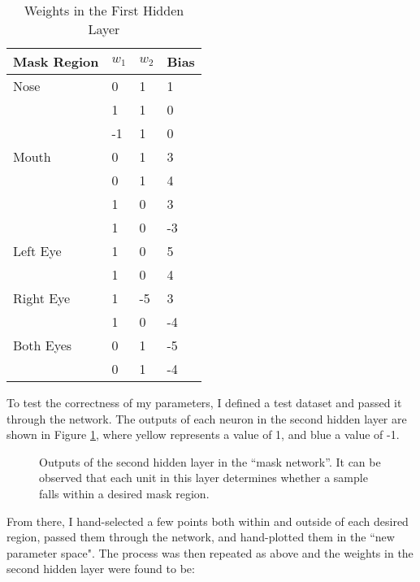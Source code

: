 \documentclass{article}[12 pt]
\begin{document}
\begin{table}[H]
	\caption{Weights in the First Hidden Layer}
	\label{tab:WeightsFirstHiddenLayer}
	\begin{center}
		\begin{tabularx}{\textwidth}{ |X|X|X|X| } 
			\hline
			\textbf{Mask Region} & \textbf{$w_1$} & \textbf{$w_2$} & \textbf{Bias}\\
			\hline
			Nose & 0 &  1& 1\\
			\hline
			  & 1 &  1 & 0\\
			\hline
			  & -1 &  1 & 0\\
			\hline
			Mouth & 0 & 1 & 3\\
			\hline
			 & 0 &  1& 4\\
			\hline
			 & 1 &  0 & 3\\
			 \hline
			 & 1 &  0 & -3\\
			 \hline
			 Left Eye & 1 & 0 & 5\\
			 \hline
			 & 1 &  0 & 4\\
			 \hline
			 Right Eye & 1 & -5 & 3\\
			 \hline
			 & 1 &  0 & -4\\
			 \hline
			 Both Eyes & 0 & 1 & -5\\
			 \hline
			 & 0 &  1 & -4\\
			 \hline
		\end{tabularx}
	\end{center}
\end{table}

\noindent To test the correctness of my parameters, I defined a test dataset and passed it through the network.  The outputs of each neuron in the second hidden layer are shown in Figure \ref{fig:maskComponents}, where yellow represents a value of 1, and blue a value of -1.



\begin{figure}[H]%
	\centering
	\qquad
	\qquad
	\qquad
	\caption{Outputs of the second hidden layer in the ``mask network''.  It can be observed that each unit in this layer determines whether a sample falls within a desired mask region.}%
	\label{fig:maskComponents}%
\end{figure}

\noindent
From there, I hand-selected a few points both within and outside of each desired region, passed them through the network, and hand-plotted them in the ``new parameter space".  The process was then repeated as above and the weights in the second hidden layer were found to be:
\end{document}

